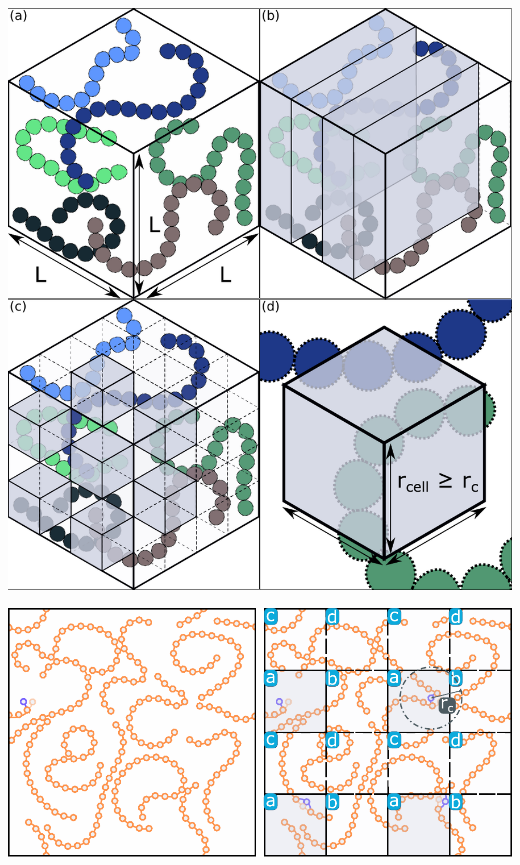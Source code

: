 \documentclass[aspectratio=169]{beamer}
\begin{document}
\begin{frame}[c]{}

  \centering
  \includegraphics[height=\textheight]{../figures/ch3_gpu/fig-domain_decomp_types/fig-domain_decomp_types.pdf}

\end{frame}

\begin{frame}[c]{}

  \centering
  \includegraphics[width=\textwidth]{../figures/ch3_gpu/fig-domain_decomp_moves/fig-domain_decomp_moves.pdf}

\end{frame}
\end{document}
